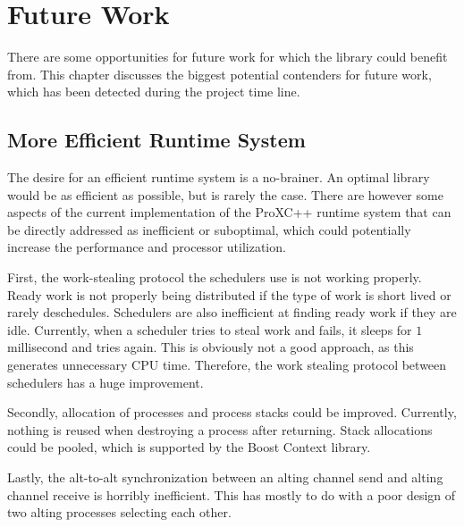 

\chapter{Future Work}
\label{ch:future_work}

There are some opportunities for future work for which the library could benefit from. This chapter discusses the biggest potential contenders for future work, which has been detected during the project time line.


\section{More Efficient Runtime System}

The desire for an efficient runtime system is a no\hyp{}brainer. An optimal library would be as efficient as possible, but is rarely the case. There are however some aspects of the current implementation of the ProXC++ runtime system that can be directly addressed as inefficient or suboptimal, which could potentially increase the performance and processor utilization.

First, the work\hyp{}stealing protocol the schedulers use is not working properly. Ready work is not properly being distributed if the type of work is short lived or rarely deschedules. Schedulers are also inefficient at finding ready work if they are idle. Currently, when a scheduler tries to steal work and fails, it sleeps for $1$ millisecond and tries again. This is obviously not a good approach, as this generates unnecessary CPU time. Therefore, the work stealing protocol between schedulers has a huge improvement.

Secondly, allocation of processes and process stacks could be improved. Currently, nothing is reused when destroying a process after returning. Stack allocations could be pooled, which is supported by the Boost Context library. 

Lastly, the alt\hyp{}to\hyp{}alt synchronization between an alting channel send and alting channel receive is horribly inefficient. This has mostly to do with a poor design of two alting processes selecting each other. 


